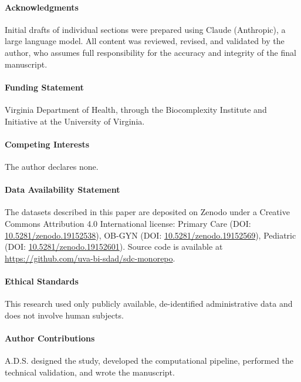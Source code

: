 \documentclass{CUP-JNL-DAP}%
\begin{document}
\begin{Backmatter}

\paragraph{Acknowledgments}
Initial drafts of individual sections were prepared using Claude (Anthropic), a large language model. All content was reviewed, revised, and validated by the author, who assumes full responsibility for the accuracy and integrity of the final manuscript.

\paragraph{Funding Statement}
Virginia Department of Health, through the Biocomplexity Institute and Initiative at the University of Virginia.

\paragraph{Competing Interests}
The author declares none.

\paragraph{Data Availability Statement}
The datasets described in this paper are deposited on Zenodo under a Creative Commons Attribution 4.0 International license: Primary Care (DOI: \href{https://doi.org/10.5281/zenodo.19152538}{10.5281/zenodo.19152538}), OB-GYN (DOI: \href{https://doi.org/10.5281/zenodo.19152569}{10.5281/zenodo.19152569}), Pediatric (DOI: \href{https://doi.org/10.5281/zenodo.19152601}{10.5281/zenodo.19152601}). Source code is available at \url{https://github.com/uva-bi-sdad/sdc-monorepo}.

\paragraph{Ethical Standards}
This research used only publicly available, de-identified administrative data and does not involve human subjects.

\paragraph{Author Contributions}
A.D.S. designed the study, developed the computational pipeline, performed the technical validation, and wrote the manuscript.


\end{Backmatter}
\end{document}
